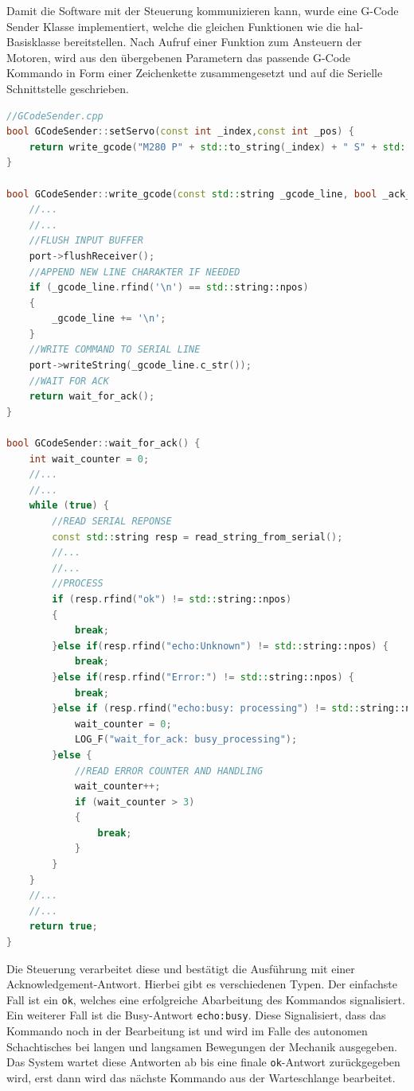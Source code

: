 Damit die Software mit der Steuerung kommunizieren kann, wurde eine
G-Code Sender Klasse implementiert, welche die gleichen Funktionen wie
die \gls{hal}-Basisklasse bereitstellen. Nach Aufruf einer Funktion zum
Ansteuern der Motoren, wird aus den übergebenen Parametern das passende
G-Code Kommando in Form einer Zeichenkette zusammengesetzt und auf die
Serielle Schnittstelle geschrieben.

\begin{lstlisting}[language={C++}]
//GCodeSender.cpp
bool GCodeSender::setServo(const int _index,const int _pos) {
    return write_gcode("M280 P" + std::to_string(_index) + " S" + std::to_string(_pos));     //MOVE SERVO
}

bool GCodeSender::write_gcode(const std::string _gcode_line, bool _ack_check) {
    //...
    //...
    //FLUSH INPUT BUFFER
    port->flushReceiver();
    //APPEND NEW LINE CHARAKTER IF NEEDED
    if (_gcode_line.rfind('\n') == std::string::npos)
    {
        _gcode_line += '\n';
    }
    //WRITE COMMAND TO SERIAL LINE
    port->writeString(_gcode_line.c_str());
    //WAIT FOR ACK
    return wait_for_ack();
}

bool GCodeSender::wait_for_ack() {
    int wait_counter = 0;
    //...
    //...
    while (true) {
        //READ SERIAL REPONSE
        const std::string resp = read_string_from_serial();
        //...
        //...
        //PROCESS
        if (resp.rfind("ok") != std::string::npos)
        {
            break;
        }else if(resp.rfind("echo:Unknown") != std::string::npos) {
            break;
        }else if(resp.rfind("Error:") != std::string::npos) {
            break;            
        }else if (resp.rfind("echo:busy: processing") != std::string::npos) {
            wait_counter = 0;
            LOG_F("wait_for_ack: busy_processing");
        }else {
            //READ ERROR COUNTER AND HANDLING
            wait_counter++;
            if (wait_counter > 3)
            {
                break;
            }
        }
    }
    //...
    //...
    return true;
}
\end{lstlisting}

Die Steuerung verarbeitet diese und bestätigt die Ausführung mit einer
Acknowledgement-Antwort. Hierbei gibt es verschiedenen Typen. Der
einfachste Fall ist ein \passthrough{\lstinline!ok!}, welches eine
erfolgreiche Abarbeitung des Kommandos signalisiert. Ein weiterer Fall
ist die Busy-Antwort \passthrough{\lstinline!echo:busy!}. Diese
Signalisiert, dass das Kommando noch in der Bearbeitung ist und wird im
Falle des autonomen Schachtisches bei langen und langsamen Bewegungen
der Mechanik ausgegeben. Das System wartet diese Antworten ab bis eine
finale \passthrough{\lstinline!ok!}-Antwort zurückgegeben wird, erst
dann wird das nächste Kommando aus der Warteschlange bearbeitet.

